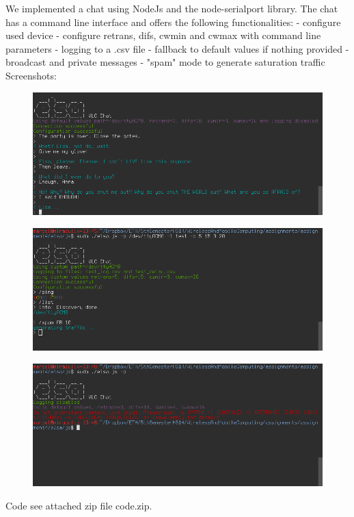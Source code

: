 We implemented a chat using NodeJs and the node-serialport library.
The chat has a command line interface and offers the following functionalities:
- configure used device
- configure retrans, difs, cwmin and cwmax with command line parameters
- logging to a .csv file
- fallback to default values if nothing provided
- broadcast and private messages
- "spam" mode to generate saturation traffic
Screenshots:
\begin{figure}[htp]
\centering
\includegraphics[scale=0.4]{../img/elsa_1.png}
\caption{}
\label{}
\end{figure}
\begin{figure}[htp]
\centering
\includegraphics[scale=0.4]{../img/elsa_2.png}
\caption{}
\label{}
\end{figure}
\begin{figure}[htp]
\centering
\includegraphics[scale=0.4]{../img/elsa_3.png}
\caption{}
\label{}
\end{figure}

Code see attached zip file code.zip.